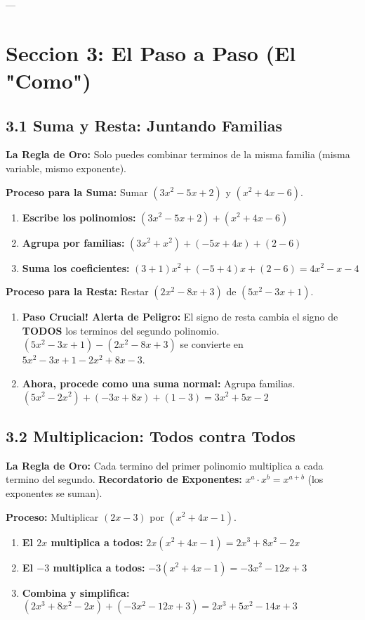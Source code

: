\documentclass[12pt,a4paper]{article}
\begin{document}
---

\section*{Seccion 3: El Paso a Paso (El "Como")}

\subsection*{3.1 Suma y Resta: Juntando Familias}
\textbf{La Regla de Oro:} Solo puedes combinar terminos de la misma familia (misma variable, mismo exponente).

\textbf{Proceso para la Suma:} Sumar $(3x^2 - 5x + 2)$ y $(x^2 + 4x - 6)$.
\begin{enumerate}
    \item \textbf{Escribe los polinomios:} $(3x^2 - 5x + 2) + (x^2 + 4x - 6)$
    \item \textbf{Agrupa por familias:} $(3x^2 + x^2) + (-5x + 4x) + (2 - 6)$
    \item \textbf{Suma los coeficientes:} $(3+1)x^2 + (-5+4)x + (2-6) = 4x^2 - x - 4$
\end{enumerate}

\textbf{Proceso para la Resta:} Restar $(2x^2 - 8x + 3)$ de $(5x^2 - 3x + 1)$.
\begin{enumerate}
    \item \textbf{Paso Crucial! Alerta de Peligro:} El signo de resta cambia el signo de \textbf{TODOS} los terminos del segundo polinomio.
    $(5x^2 - 3x + 1) - (2x^2 - 8x + 3)$ se convierte en $5x^2 - 3x + 1 - 2x^2 + 8x - 3$.
    \item \textbf{Ahora, procede como una suma normal:} Agrupa familias.
    $(5x^2 - 2x^2) + (-3x + 8x) + (1 - 3) = 3x^2 + 5x - 2$
\end{enumerate}

\subsection*{3.2 Multiplicacion: Todos contra Todos}
\textbf{La Regla de Oro:} Cada termino del primer polinomio multiplica a cada termino del segundo.
\textbf{Recordatorio de Exponentes:} $x^a \cdot x^b = x^{a+b}$ (los exponentes se suman).

\textbf{Proceso:} Multiplicar $(2x - 3)$ por $(x^2 + 4x - 1)$.
\begin{enumerate}
    \item \textbf{El $2x$ multiplica a todos:} $2x(x^2 + 4x - 1) = 2x^3 + 8x^2 - 2x$
    \item \textbf{El $-3$ multiplica a todos:} $-3(x^2 + 4x - 1) = -3x^2 - 12x + 3$
    \item \textbf{Combina y simplifica:} $(2x^3 + 8x^2 - 2x) + (-3x^2 - 12x + 3) = 2x^3 + 5x^2 - 14x + 3$
\end{enumerate}
\end{document}
